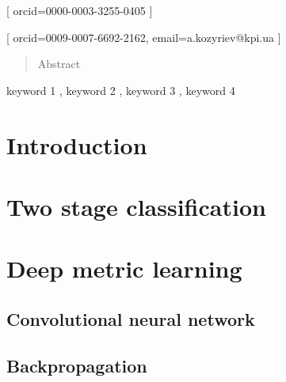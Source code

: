 \documentclass{ceurart}
\begin{document}
\title{}

\author[1,2]{Vladimir Norkin}[%
    orcid=0000-0003-3255-0405
]
\author[2]{Anton Kozyriev}[%
    orcid=0009-0007-6692-2162,
    email=a.kozyriev@kpi.ua
]

\address[1]{V.M. Glushkov Institute of Cybernetics of the NAS of Ukraine, Kyiv}
\address[2]{National Technical University of Ukraine "Igor Sikorsky Kyiv Polytechnic Institute", Kyiv}

\begin{abstract}
  Abstract
\end{abstract}

\begin{keywords}
  keyword 1 \sep
  keyword 2 \sep
  keyword 3 \sep
  keyword 4
\end{keywords}

\maketitle

\section{Introduction}

\section{Two stage classification}

\section{Deep metric learning}

\subsection{Convolutional neural network}

\subsection{Backpropagation}
\end{document}
